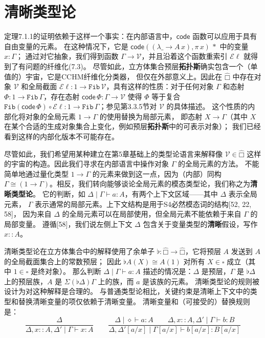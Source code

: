 \documentclass{ctexrep}
\theoremstyle{plain}
\theoremstyle{definition}
\theoremstyle{remark}
\newcommand\hatcube{\widehat{□}}
\begin{document}
\section{清晰类型论}

定理7.1.1的证明依赖于这样一个事实：在内部语言中，$\mathsf{code}$ 函数可以应用于具有自由变量的元素。
在这种情况下，它是 $\mathsf{code}((\lambda\_ \to A\,x), \pi\,x)\,\ast$ 中的变量 $x : \Gamma$；
通过对它抽象，我们得到函数 $\Gamma \to \mathcal{V}$，并且沿着这个函数重索引 $\mathcal{E}\!\ell$ 就得到了有问题的纤维化(7.3)。
尽管如此，立方体集合预层\textbf{拓扑斯}确实包含一个（单值的）宇宙，它是CCHM纤维化分类器，
但仅在外部意义上。因此在 $\hatcube$ 中存在对象 $\mathcal{V}$ 和全局截面 
$\mathcal{E}\!\ell : 1 \to \mathtt{Fib}\,\mathcal{V}$，具有这样的性质：对于任何对象 $\Gamma$ 和态射 
$\Phi : 1 \to \mathtt{Fib}\,\Gamma$，存在态射 $\mathsf{code}\,\Phi : \Gamma \to \mathcal{V}$ 使得 $\Phi$ 等于复合
$\mathtt{Fib}(\mathsf{code}\,\Phi) \circ \mathcal{E}\!\ell : 1 \to \mathtt{Fib}\,\Gamma$；参见第3.3.5节对 $\mathcal{V}$ 的具体描述。
这个性质的内部化将对象的全局元素 $1 \to \Gamma$ 的使用替换为局部元素，
即态射 $X \to \Gamma$（其中 $X$ 在某个合适的生成对象集合上变化，例如预层\textbf{拓扑斯}中的可表示对象）；
我们已经看到这样的内部化版本不可能存在。

尽管如此，我们希望用某种建立在第5章基础上的类型论语言来解释像 
$\mathcal{V} \in \hatcube$ 这样的宇宙的构造。因此我们寻求在内部语言中操作对象 $\Gamma$ 的全局元素的方法。
不能简单地通过量化类型 $1 \to \Gamma$ 的元素来做到这一点，因为（内部）同构 
$\Gamma \cong (1 \to \Gamma)$。相反，我们转向能够谈论全局元素的模态类型论，我们称之为\textbf{清晰类型论}。
它的判断，如 $\Delta \mid \Gamma \vdash a : A$，有两个上下文区域——其中 $\Delta$ 表示全局元素，
$\Gamma$ 表示通常的局部元素。上下文结构是用于S4必然模态词的结构[52, 22, 58]，
因为来自 $\Delta$ 的全局元素可以在局部使用，但全局元素不能依赖于来自 $\Gamma$ 的局部变量。
遵循[58]，我们说左侧上下文 $\Delta$ 包含关于变量类型的\textbf{清晰}假设，写作 $x :: A$。

清晰类型论在立方体集合中的解释使用了余单子 
$\flat : \hatcube \to \hatcube$，它将预层 $A$ 发送到 $A$ 的全局截面集合上的常数预层；
因此 $\flat A(X) \cong A(1)$ 对所有 $X \in \square$ 成立（其中 $1 \in \square$ 是终对象）。
那么判断 $\Delta \mid \Gamma \vdash a : A$ 描述的情况是：$\Delta$ 是预层，$\Gamma$ 是 
$\flat\Delta$ 上的预层族，$A$ 是 $\Sigma(\flat\Delta)\Gamma$ 上的族，而 $a$ 是该族的元素。
清晰类型论的规则被设计为对这种解释是合理的。
与普通类型论相比，关键约束是清晰上下文中的类型和替换清晰变量的项仅依赖于清晰变量。
清晰变量和（可接受的）替换规则是：
\begin{equation}
\frac{\Delta}{\Delta, x :: A, \Delta' \mid \Gamma \vdash x : A}
\qquad
\frac{\Delta \mid \diamond \vdash a : A \qquad \Delta, x :: A, \Delta' \mid \Gamma \vdash b : B}
     {\Delta, \Delta'[a/x] \mid \Gamma[a/x] \vdash b[a/x] : B[a/x]}
\end{equation}
\end{document}
